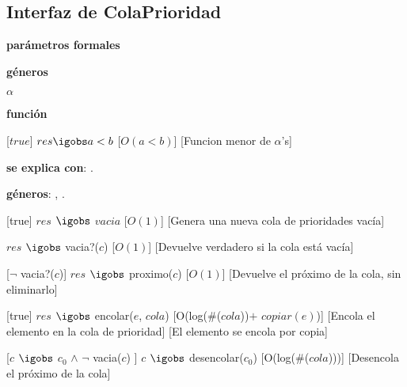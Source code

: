 \begin{Interfaz}
\subsection{Interfaz de ColaPrioridad}

  \textbf{par\'ametros formales}\parindent\\
  \parbox{1.7cm}{\textbf{g\'eneros}} $\alpha$\\
  \parbox[t]{1.7cm}{\textbf{funci\'on}}\parbox[t]{\textwidth-2\parindent-1.7cm}{%
    [$true$]
    {$res \igobs a < b$}
    [$O(a < b)$]
    [Funcion menor de $\alpha$'s]
  }

\textbf{se explica con}: .

\textbf{g\'eneros}: , .



%
[true]   %
{$res$ $\igobs$ $vacia$} %
[$O(1)$]   %
[Genera una nueva cola de prioridades vac\'ia]  %

{$res$ $\igobs$ vacia?($c$)}
[$O(1)$]
[Devuelve verdadero si la cola est\'a vac\'ia]

[$\neg$ vacia?($c$)]  
{$res$ $\igobs$ proximo($c$)}  %
[$O(1)$]
[Devuelve el pr\'oximo de la cola, sin eliminarlo]

%
[true]   %
{$res$ $\igobs$ encolar($e$, $cola$)} %
[O(log($\#$($cola$))$+$ $copiar(e)$)]   %
[Encola el elemento en la cola de prioridad] %
[El elemento se encola por copia]

[$c$ $\igobs$ $c_0$ $\land$ $\neg$ vacia($c$) ]  
{$c$ $\igobs$ desencolar($c_0$)} 
[O(log($\#$($cola$)))]   %
[Desencola el pr\'oximo de la cola]


$ $\newline
$ $\newline




\begin{tad}{}



\end{tad}

\end{Interfaz}

